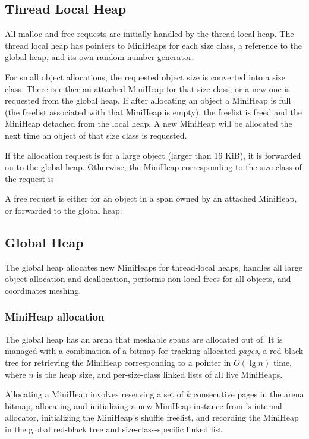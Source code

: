 \subsection{Thread Local Heap}

All malloc and free requests are initially handled by the thread local
heap.  The thread local heap has pointers to MiniHeaps for each size
class, a reference to the global heap, and its own random number
generator.

For small object allocations, the requested object size is converted
into a size class.  There is either an attached MiniHeap for that size
class, or a new one is requested from the global heap.  If after
allocating an object a MiniHeap is full (the freelist associated with
that MiniHeap is empty), the freelist is freed and the MiniHeap
detached from the local heap.  A new MiniHeap will be allocated the
next time an object of that size class is requested.

If the allocation request is for a large object (larger than 16 KiB),
it is forwarded on to the global heap.  Otherwise, the MiniHeap
corresponding to the size-class of the request is

A free request is either for an object in a span owned by an attached
MiniHeap, or forwarded to the global heap.

\subsection{Global Heap}

The global heap allocates new MiniHeaps for thread-local heaps,
handles all large object allocation and deallocation, performs
non-local frees for all objects, and coordinates meshing.

\subsubsection{MiniHeap allocation}

The global heap has an arena that meshable spans are allocated out of.
It is managed with a combination of a bitmap for tracking allocated
\textit{pages}, a red-black tree for retrieving the MiniHeap
corresponding to a pointer in $O(\lg{n})$ time, where $n$ is the heap
size, and per-size-class linked lists of all live MiniHeaps.

Allocating a MiniHeap involves reserving a set of $k$ consecutive
pages in the arena bitmap, allocating and initializing a new MiniHeap
instance from \Mesh's internal allocator, initializing the MiniHeap's
shuffle freelist, and recording the MiniHeap in the global red-black
tree and size-class-specific linked list.

